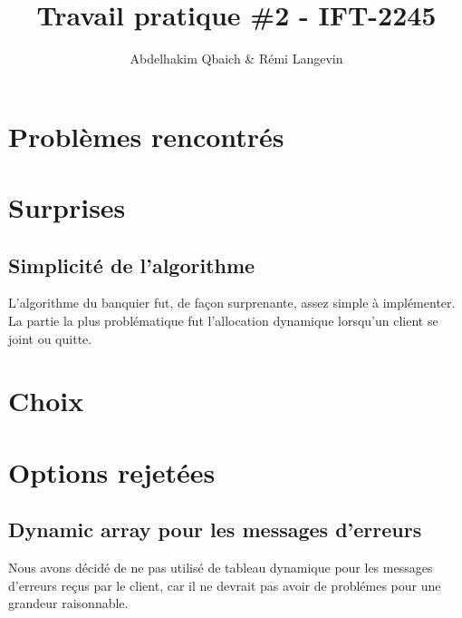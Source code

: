 \documentclass[11pt]{article}
\title{Travail pratique \#2 - IFT-2245}
\author{Abdelhakim Qbaich & R\'emi Langevin}
\begin{document}
\maketitle

\section*{Probl\`emes rencontr\'es}
\subsection*{}

\section*{Surprises}
\subsection*{Simplicit\'e de l'algorithme}
L'algorithme du banquier fut, de fa\c{c}on surprenante, assez simple \`a 
impl\'ementer. La partie la plus probl\'ematique fut l'allocation dynamique
lorsqu'un client se joint ou quitte.
\section*{Choix}

\section*{Options rejet\'ees}

\subsection*{Dynamic array pour les messages d'erreurs}
Nous avons d\'ecid\'e de ne pas utilis\'e de tableau dynamique pour les messages
d'erreurs re\c{c}us par le client, car il ne devrait pas avoir de probl\'emes
pour une grandeur raisonnable.
\end{document}
